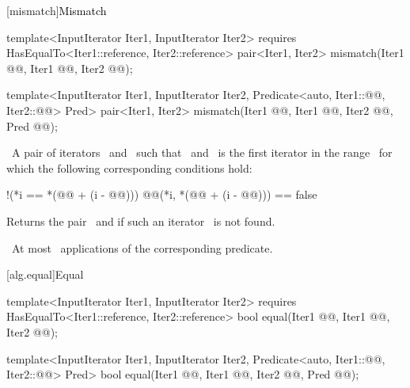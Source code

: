 \documentclass[american,twoside]{book}
\begin{document}
\begin{paras}
[mismatch]{\textcolor{black}{Mismatch}}

%
\color{addclr}\begin{itemdecl}
template<InputIterator Iter1, InputIterator Iter2>
  requires HasEqualTo<Iter1::reference, Iter2::reference>
  pair<Iter1, Iter2> mismatch(Iter1 @@, Iter1 @@,
                              Iter2 @@);

template<InputIterator Iter1, InputIterator Iter2,
         Predicate<auto, Iter1::@@, Iter2::@@> Pred>
  pair<Iter1, Iter2> mismatch(Iter1 @@, Iter1 @@,
                              Iter2 @@, Pred @@);
\end{itemdecl}\color{black}

\begin{itemdescr}
\pnum
\returns\ 
A pair of iterators
\
and
\
such that
\
and
\tcode{i}\
is the first iterator
in the range \
for which the following corresponding conditions hold:

\begin{codeblock}
  !(*i == *(@@ + (i - @@)))
  @\farg{pred}@(*i, *(@@ + (i - @@))) == false
\end{codeblock}

Returns the pair \ and
if such an iterator
\tcode{i}\
is not found.

\pnum
\complexity\ 
At most
\tcode{\farg{last1}\ - }\
applications of the corresponding predicate.
\end{itemdescr}

\rSec2[alg.equal]{Equal}

%
\color{addclr}\begin{itemdecl}
template<InputIterator Iter1, InputIterator Iter2>
  requires HasEqualTo<Iter1::reference, Iter2::reference>
  bool equal(Iter1 @\farg{first1}@, Iter1 @@,
             Iter2 @@);

template<InputIterator Iter1, InputIterator Iter2,
         Predicate<auto, Iter1::@@, Iter2::@@> Pred>
  bool equal(Iter1 @@, Iter1 @@,
             Iter2 @@, Pred @@);
\end{itemdecl}\color{black}


\end{paras}
\end{document}
